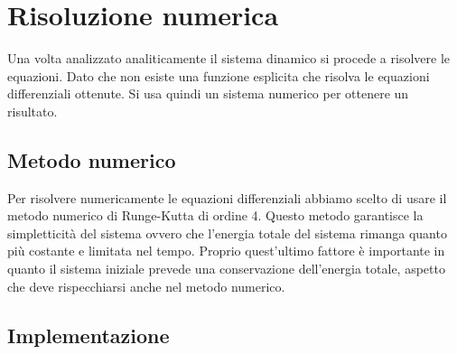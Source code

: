 \documentclass[a4paper, 12pt]{article}
\begin{document}
\section{Risoluzione numerica}

Una volta analizzato analiticamente il sistema dinamico si procede a risolvere le equazioni. Dato che non esiste una funzione esplicita che risolva le equazioni differenziali ottenute. Si usa quindi un sistema numerico per ottenere un risultato.

\subsection{Metodo numerico}

Per risolvere numericamente le equazioni differenziali abbiamo scelto di usare il metodo numerico di Runge-Kutta di ordine 4. Questo metodo garantisce la simpletticità del sistema ovvero che l'energia totale del sistema rimanga quanto più costante e limitata nel tempo. Proprio quest'ultimo fattore è importante in quanto il sistema iniziale prevede una conservazione dell'energia totale, aspetto che deve rispecchiarsi anche nel metodo numerico.

\subsection{Implementazione}



\begingroup
\obeylines
\inputminted[fontsize=\scriptsize, linenos, breaklines=true, xleftmargin=0.75cm, frame=lines]{cython}{code/Python/file_1.pyx}
\endgroup

\newpage
\end{document}
